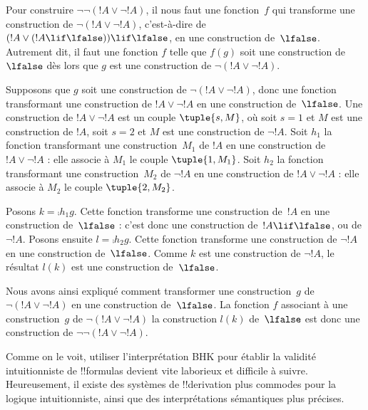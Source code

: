 \documentclass[../../../include/open-logic-section]{subfiles}
\begin{document}
\begin{ex}
Pour construire $\lnot \lnot (!A \lor \lnot !A)$, il nous faut
une fonction~$f$ qui transforme une construction de
$\lnot(!A \lor \lnot !A)$, c'est-à-dire de
$(!A \lor (!A \lif \lfalse)) \lif \lfalse$, en une construction
de~$\lfalse$. Autrement dit, il faut une fonction $f$ telle que
$f(g)$ soit une construction de~$\lfalse$ dès lors que $g$ est
une construction de $\lnot(!A \lor \lnot !A)$.

Supposons que $g$ soit une construction de $\lnot(!A \lor \lnot !A)$,
donc une fonction transformant une construction de $!A \lor \lnot !A$
en une construction de~$\lfalse$. Une construction de $!A \lor \lnot !A$
est un couple $\tuple{s, M}$, où soit $s = 1$ et $M$ est une
construction de $!A$, soit $s = 2$ et $M$ est une construction
de $\lnot !A$. Soit $h_1$ la fonction transformant une construction~$M_1$
de $!A$ en une construction de $!A \lor \lnot !A$ : elle
associe à $M_1$ le couple $\tuple{1, M_1}$.
Soit $h_2$ la fonction transformant une construction~$M_2$
de $\lnot !A$ en une construction de $!A \lor \lnot !A$ :
elle associe à $M_2$ le couple $\tuple{2, M_2}$.

Posons $k = \comp{h_1}{g}$. Cette fonction transforme une
construction de~$!A$ en une construction de~$\lfalse$ : c'est
donc une construction de~$!A \lif \lfalse$, ou de $\lnot !A$.
Posons ensuite $l = \comp{h_2}{g}$. Cette fonction transforme
une construction de $\lnot !A$ en une construction de~$\lfalse$.
Comme $k$ est une construction de $\lnot !A$, le résultat
$l(k)$ est une construction de~$\lfalse$.

Nous avons ainsi expliqué comment transformer une construction~$g$
de $\lnot(!A \lor \lnot !A)$ en une construction de~$\lfalse$.
La fonction $f$ associant à une construction~$g$ de
$\lnot(!A \lor \lnot !A)$ la construction $l(k)$ de~$\lfalse$
est donc une construction de $\lnot\lnot(!A \lor \lnot !A)$.
\end{ex}

Comme on le voit, utiliser l'interprétation BHK pour établir la
validité intuitionniste de !!{formula}s devient vite laborieux
et difficile à suivre. Heureusement, il existe des systèmes de
!!{derivation} plus commodes pour la logique intuitionniste,
ainsi que des interprétations sémantiques plus précises.
\end{document}
